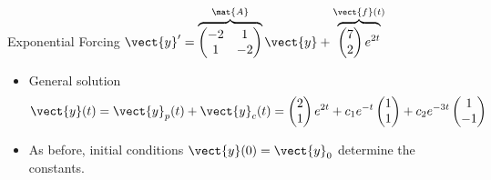 \begin{frame}{Exponential Forcing \qquad $\vect{y}'=\overbrace{\begin{pmatrix}-2&1\\1&-2\end{pmatrix}}^{\mat{A}}\vect{y}+\overbrace{\begin{pmatrix}7\\2\end{pmatrix}e^{2t}}^{\vect{f}(t)}$}
\begin{itemize}
  and $\vect{y}_p(t)=\begin{pmatrix}2\\1\end{pmatrix}e^{2t}$.
  \item General solution
  \[
    \vect{y}(t)=\vect{y}_p(t)+\vect{y}_c(t)
    =\begin{pmatrix}2\\1\end{pmatrix}e^{2t}
    +c_1e^{-t}\begin{pmatrix}1\\1\end{pmatrix}
    +c_2e^{-3t}\begin{pmatrix}1\\-1\end{pmatrix}
  \]
  \item As before, initial conditions $\vect{y}(0)=\vect{y}_0$ determine the constants.
\end{itemize}
\end{frame}
